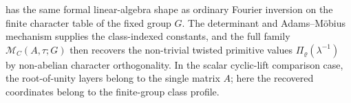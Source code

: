 \begin{remark}
  \label{rem:recovery-analogy-orthogonality-step}
  \label{rem:readout-analogy-orthogonality-step}
   has the same formal linear-algebra
  shape as ordinary Fourier inversion on the finite character table of the
  fixed group \(G\).  The determinant and Adams--M\"obius mechanism supplies
  the class-indexed constants, and the full family
  \(\mathcal M_C(A,\tau;G)\) then recovers the non-trivial twisted primitive
  values \(\Pi_\varrho(\lambda^{-1})\) by non-abelian character
  orthogonality.  In the scalar cyclic-lift comparison case, the
  root-of-unity layers belong to the single matrix \(A\); here the recovered
  coordinates belong to the finite-group class profile.
\end{remark}
